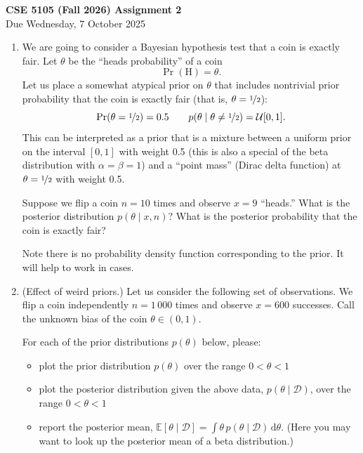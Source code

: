 \documentclass{article}
\newcommand{\given}{\mid}
\newcommand{\mc}[1]{\mathcal{#1}}
\newcommand{\data}{\mc{D}}
\newcommand{\intd}[1]{\,\mathrm{d}{#1}}
\begin{document}
{\large \textbf{CSE 5105 (Fall 2026) Assignment 2}} \\
Due Wednesday, 7 October 2025 \\

\begin{enumerate}

\item

  We are going to consider a Bayesian hypothesis test that a coin is
  exactly fair. Let $\theta$ be the ``heads probability'' of a coin
  \[
    \Pr(\text{H}) = \theta.
  \]
  Let us place a somewhat atypical prior on $\theta$ that includes
  nontrivial prior probability that the coin is exactly fair (that is,
  $\theta = \nicefrac{1}{2}$):
  \[
    \Pr(\theta = \nicefrac{1}{2}) = 0.5
    \qquad
    p(\theta \given \theta \neq \nicefrac{1}{2}) = \mc{U}[0, 1].
  \]
  This can be interpreted as a prior that is a mixture between a uniform
  prior on the interval $[0, 1]$ with weight 0.5 (this is also a special
  of the beta distribution with $\alpha = \beta = 1$) and a ``point
  mass'' (Dirac delta function) at $\theta = \nicefrac{1}{2}$ with
  weight 0.5.

  Suppose we flip a coin $n = 10$ times and observe $x = 9$ ``heads.''
  What is the posterior distribution $p(\theta \given x, n)$?  What is
  the posterior probability that the coin is exactly fair?

  Note there is no probability density function corresponding to the
  prior. It will help to work in cases.

\item
  (Effect of weird priors.)  Let us consider the following set of
  observations. We flip a coin independently $n = 1\,000$ times and
  observe $x = 600$ successes. Call the unknown bias of the coin
  $\theta \in (0, 1)$.

  For each of the prior distributions $p(\theta)$ below, please:
  \begin{itemize}
  \item
    plot the prior distribution $p(\theta)$ over the range $0 < \theta < 1$
  \item
    plot the posterior distribution given the above data, $p(\theta
    \given \data)$, over the range $0 < \theta < 1$
  \item
    report the posterior mean,
    $\mathbb{E}[\theta \given \data] = \int \theta\,p(\theta\given\data)\intd\theta$.
    (Here you may want to look up the posterior mean of a beta distribution.)
  \end{itemize}


\end{enumerate}
\end{document}
